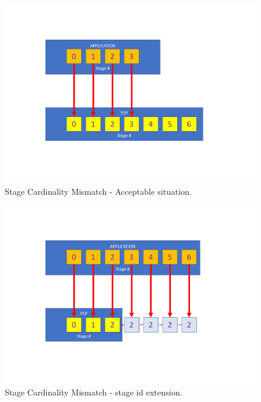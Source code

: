 \begin{figure}[tbhp]
	\centering
	\includegraphics[width=\columnwidth]{images/stage_cardinality_mismatch_ok.pdf}
	\caption{Stage Cardinality Mismatch - Acceptable situation.}
	\label{fig:stage_cardinality_mismatch_ok}
\end{figure}
\begin{figure}[tbhp]
	\centering
	\includegraphics[width=\columnwidth]{images/stage_id_extension.pdf}
	\caption{Stage Cardinality Mismatch - stage id extension.}
	\label{fig:stage_id_extension}
\end{figure}


